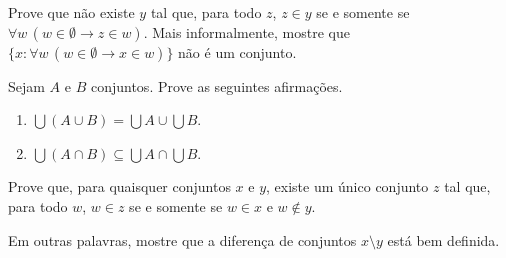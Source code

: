 \begin{exercise}\label{exr:uniaoSemIntersecao}
    Prove que não existe $y$ tal que, para todo $z$, $z \in y$ se e somente se $\forall w\, (w \in \emptyset \rightarrow z \in w)$.
    Mais informalmente, mostre que $\{x: \forall w\, (w \in \emptyset \rightarrow x \in w)\}$ não é um conjunto.
\end{exercise}

\begin{exercise}
    Sejam $A$ e $B$ conjuntos.
    Prove as seguintes afirmações.
    \begin{enumerate}
        \item $\bigcup (A \cup B) = \bigcup A \cup \bigcup B$.
        \item $\bigcup (A \cap B) \subseteq \bigcup A \cap \bigcup B$.
    \end{enumerate}
\end{exercise}

\begin{exercise}\label{exr:existenciaDaDiferenca}
    Prove que, para quaisquer conjuntos $x$ e $y$, existe um único conjunto $z$ tal que, para todo $w$, $w \in z$ se e somente se $w \in x$ e $w \notin y$.
    
    Em outras palavras, mostre que a diferença de conjuntos $x\setminus y$ está bem definida.
\end{exercise}

